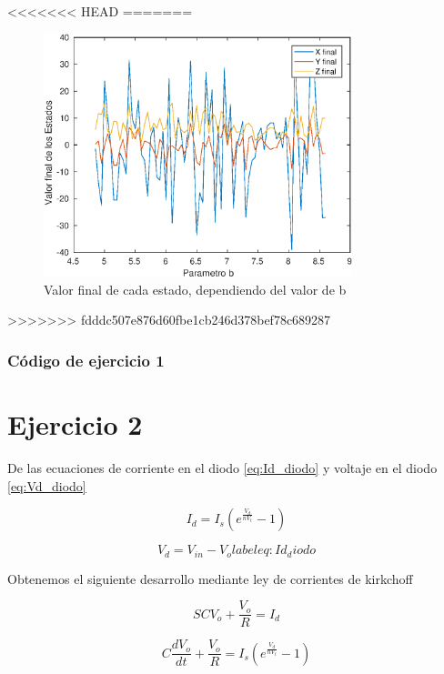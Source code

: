 \documentclass[12pt,letterpaper]{article}
\begin{document}
<<<<<<< HEAD
=======
\begin{figure}
	\centering
	\includegraphics[width=0.8\textwidth]{pictures/sensibilidad}
	\caption{Valor final de cada estado, dependiendo del valor de b}
	\label{fig:sensibilidad}
\end{figure}
>>>>>>> fdddc507e876d60fbe1cb246d378bef78c689287

\subsubsection{Código de ejercicio 1}



\section{Ejercicio 2}

De las ecuaciones de corriente en el diodo \eqref{eq:Id_diodo} y voltaje en el diodo  \eqref{eq:Vd_diodo}

\begin{equation}
\label{eq:Id_diodo}
I_d=I_s(e^{\frac{V_d}{nV_t}}-1)
\end{equation}



\begin{equation}\label{eq:Vd_diodo}
V_d= V_{in}-V_o
label{eq:Id_diodo}
\end{equation}

Obtenemos el siguiente desarrollo mediante ley de corrientes de kirkchoff 

\begin{equation}
SCV_o + \frac{V_o}{R} = I_d
\end{equation}

\begin{equation}
C \frac{dV_o}{dt} + \frac{V_o}{R} = I_s\left(e^{\frac{V_d}{nV_t}}-1\right)
\end{equation}
\end{document}
